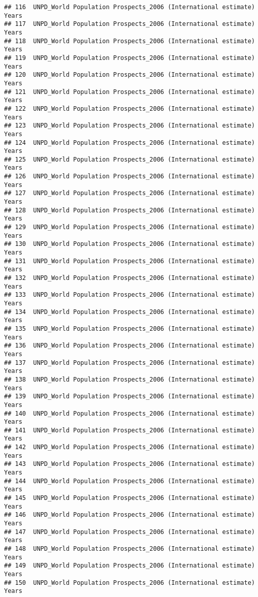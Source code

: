 \documentclass[]{article}
\begin{document}
\begin{verbatim}
## 116  UNPD_World Population Prospects_2006 (International estimate) Years
## 117  UNPD_World Population Prospects_2006 (International estimate) Years
## 118  UNPD_World Population Prospects_2006 (International estimate) Years
## 119  UNPD_World Population Prospects_2006 (International estimate) Years
## 120  UNPD_World Population Prospects_2006 (International estimate) Years
## 121  UNPD_World Population Prospects_2006 (International estimate) Years
## 122  UNPD_World Population Prospects_2006 (International estimate) Years
## 123  UNPD_World Population Prospects_2006 (International estimate) Years
## 124  UNPD_World Population Prospects_2006 (International estimate) Years
## 125  UNPD_World Population Prospects_2006 (International estimate) Years
## 126  UNPD_World Population Prospects_2006 (International estimate) Years
## 127  UNPD_World Population Prospects_2006 (International estimate) Years
## 128  UNPD_World Population Prospects_2006 (International estimate) Years
## 129  UNPD_World Population Prospects_2006 (International estimate) Years
## 130  UNPD_World Population Prospects_2006 (International estimate) Years
## 131  UNPD_World Population Prospects_2006 (International estimate) Years
## 132  UNPD_World Population Prospects_2006 (International estimate) Years
## 133  UNPD_World Population Prospects_2006 (International estimate) Years
## 134  UNPD_World Population Prospects_2006 (International estimate) Years
## 135  UNPD_World Population Prospects_2006 (International estimate) Years
## 136  UNPD_World Population Prospects_2006 (International estimate) Years
## 137  UNPD_World Population Prospects_2006 (International estimate) Years
## 138  UNPD_World Population Prospects_2006 (International estimate) Years
## 139  UNPD_World Population Prospects_2006 (International estimate) Years
## 140  UNPD_World Population Prospects_2006 (International estimate) Years
## 141  UNPD_World Population Prospects_2006 (International estimate) Years
## 142  UNPD_World Population Prospects_2006 (International estimate) Years
## 143  UNPD_World Population Prospects_2006 (International estimate) Years
## 144  UNPD_World Population Prospects_2006 (International estimate) Years
## 145  UNPD_World Population Prospects_2006 (International estimate) Years
## 146  UNPD_World Population Prospects_2006 (International estimate) Years
## 147  UNPD_World Population Prospects_2006 (International estimate) Years
## 148  UNPD_World Population Prospects_2006 (International estimate) Years
## 149  UNPD_World Population Prospects_2006 (International estimate) Years
## 150  UNPD_World Population Prospects_2006 (International estimate) Years

\end{verbatim}
\end{document}
